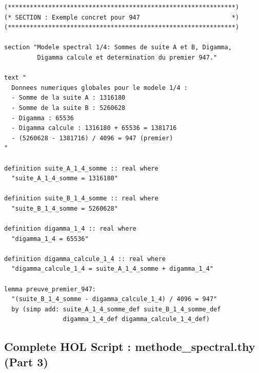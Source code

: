 \documentclass[a4paper,11pt]{article}
\begin{document}
\begin{holcode}[title={\textcolor{white}{File: methode\_spectral.thy -- Part 2/4}}]
\begin{lstlisting}
(**************************************************************)
(* SECTION : Exemple concret pour 947                         *)
(**************************************************************)

section "Modele spectral 1/4: Sommes de suite A et B, Digamma, 
         Digamma calcule et determination du premier 947."

text "
  Donnees numeriques globales pour le modele 1/4 :
  - Somme de la suite A : 1316180
  - Somme de la suite B : 5260628
  - Digamma : 65536
  - Digamma calcule : 1316180 + 65536 = 1381716
  - (5260628 - 1381716) / 4096 = 947 (premier)
"

definition suite_A_1_4_somme :: real where
  "suite_A_1_4_somme = 1316180"

definition suite_B_1_4_somme :: real where
  "suite_B_1_4_somme = 5260628"

definition digamma_1_4 :: real where
  "digamma_1_4 = 65536"

definition digamma_calcule_1_4 :: real where
  "digamma_calcule_1_4 = suite_A_1_4_somme + digamma_1_4"

lemma preuve_premier_947:
  "(suite_B_1_4_somme - digamma_calcule_1_4) / 4096 = 947"
  by (simp add: suite_A_1_4_somme_def suite_B_1_4_somme_def
                digamma_1_4_def digamma_calcule_1_4_def)
\end{lstlisting}
\end{holcode}

\newpage
\subsection{Complete HOL Script : methode\_spectral.thy (Part 3)}
\end{document}
